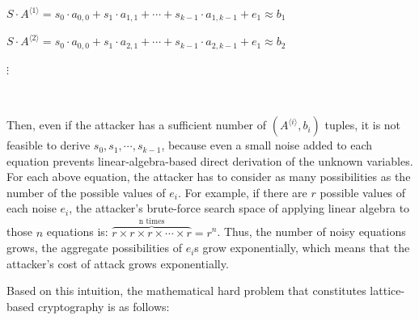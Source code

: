 $S \cdot A^{\langle 1 \rangle} = s_0\cdot a_{0,0} + s_1\cdot a_{1,1} + \cdots + s_{k-1}\cdot a_{1,k-1} + e_1 \approx b_1$

$S \cdot A^{\langle 2 \rangle} = s_0\cdot a_{0,0} + s_1\cdot a_{2,1} + \cdots + s_{k-1}\cdot a_{2,k-1} + e_1 \approx b_2$

\text{ } $\vdots$


$ $

Then, even if the attacker has a sufficient number of $(A^{\langle i \rangle}, b_i)$ tuples, it is not feasible to derive $s_0, s_1, \cdots, s_{k-1}$, because even a small noise added to each equation prevents linear-algebra-based direct derivation of the unknown variables. For each above equation, the attacker has to consider as many possibilities as the number of the possible values of $e_i$. For example, if there are $r$ possible values of each noise $e_i$, the attacker's brute-force search space of applying linear algebra to those $n$ equations is: $\overbrace{r \times r \times r \times \cdots \times r}^{\text{n times}} = r^n$. Thus, the number of noisy equations grows, the aggregate possibilities of $e_i$s grow exponentially, which means that the attacker's cost of attack grows exponentially. 

Based on this intuition, the mathematical hard problem that constitutes lattice-based cryptography is as follows:

$ $

